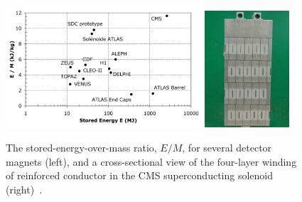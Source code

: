 \begin{figure}
\centering
\includegraphics[width=0.65\textwidth]{figures/lhc_and_cms/solenoid_energyOverMass_vs_mass.png}
\hspace{5 mm}
\includegraphics[width=0.28\textwidth]{figures/lhc_and_cms/solenoid_cross_section.png}
\caption{The stored-energy-over-mass ratio, $E/M$, for several detector magnets (left), and a cross-sectional view of the four-layer winding of reinforced conductor in the CMS superconducting solenoid (right)~\cite{cms_experiment}.}
\label{solenoid_figures}
\end{figure}